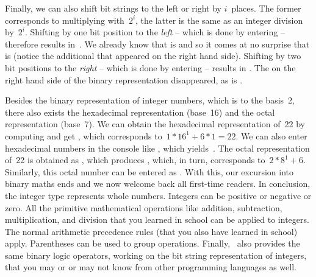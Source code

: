 Finally, we can also shift bit strings to the left or right by $i$~places.
The former corresponds to multiplying with~$2^i$, the latter is the same as an integer division by~$2^i$.
Shifting  by one bit position to the \emph{left} -- which is done by entering \pythonIdx{<\strut<} -- therefore results in~.
We already know that  is  and so it comes at no surprise that  is  (notice the additional  that appeared on the right hand side).
Shifting  by two bit positions to the \emph{right} -- which is done by entering \pythonIdx{>\strut>} -- results in .
The  on the right hand side of the binary representation disappeared, as  is .

Besides the binary representation of integer numbers, which is to the basis~2, there also exists the hexadecimal representation (base~16) and the octal representation (base~7).
We can obtain the hexadecimal representation of~22 by computing  and get , which corresponds to~$1*16^1+6*1=22$.
We can also enter hexadecimal numbers in the console like , which yields~.
The octal representation of~22 is obtained as , which produces , which, in turn, corresponds to~$2*8^1+6$.
Similarly, this octal number can be entered as .
With this, our excursion into binary maths ends and we now welcome back all first-time readers.%
%
\endhsection%
%
%
In conclusion, the integer type  represents whole numbers.
Integers can be positive or negative or zero.
All the primitive mathematical operations like addition, subtraction, multiplication, and division that you learned in school can be applied to integers.
The normal arithmetic precedence rules (that you also have learned in school) apply.
Parentheses can be used to group operations.
Finally, \python\ also provides the same binary logic operators, working on the bit string representation of integers, that you may or or may not know from other programming languages as well.
\endhsection%
\endhsection%
%
